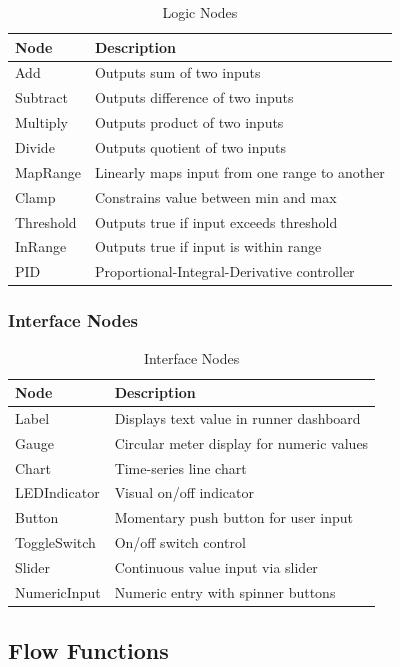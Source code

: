 \documentclass[11pt,a4paper]{article}
\begin{document}
\begin{table}[H]
\centering
\begin{tabular}{@{}lp{8cm}@{}}
\toprule
\textbf{Node} & \textbf{Description} \\
\midrule
Add & Outputs sum of two inputs \\
Subtract & Outputs difference of two inputs \\
Multiply & Outputs product of two inputs \\
Divide & Outputs quotient of two inputs \\
MapRange & Linearly maps input from one range to another \\
Clamp & Constrains value between min and max \\
Threshold & Outputs true if input exceeds threshold \\
InRange & Outputs true if input is within range \\
PID & Proportional-Integral-Derivative controller \\
\bottomrule
\end{tabular}
\caption{Logic Nodes}
\end{table}

\subsubsection{Interface Nodes}

\begin{table}[H]
\centering
\begin{tabular}{@{}lp{8cm}@{}}
\toprule
\textbf{Node} & \textbf{Description} \\
\midrule
Label & Displays text value in runner dashboard \\
Gauge & Circular meter display for numeric values \\
Chart & Time-series line chart \\
LEDIndicator & Visual on/off indicator \\
Button & Momentary push button for user input \\
ToggleSwitch & On/off switch control \\
Slider & Continuous value input via slider \\
NumericInput & Numeric entry with spinner buttons \\
\bottomrule
\end{tabular}
\caption{Interface Nodes}
\end{table}

\subsection{Flow Functions}
\end{document}
